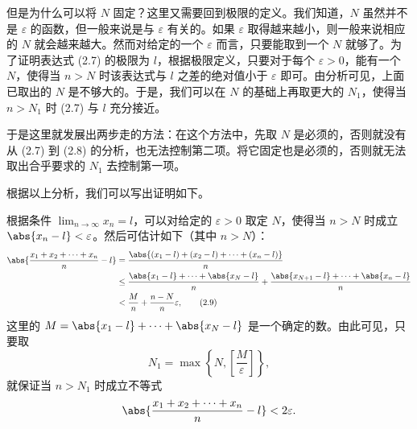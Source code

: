 但是为什么可以将 $N$ 固定？这里又需要回到极限的定义。我们知道，$N$ 虽然并不是 $\varepsilon$ 的函数，但一般来说是与 $\varepsilon$ 有关的。如果 $\varepsilon$ 取得越来越小，则一般来说相应的 $N$ 就会越来越大。然而对给定的一个 $\varepsilon$ 而言，只要能取到一个 $N$ 就够了。为了证明表达式 (2.7) 的极限为 $l$，根据极限定义，只要对于每个 $\varepsilon>0$，能有一个 $N$，使得当 $n>N$ 时该表达式与 $l$ 之差的绝对值小于 $\varepsilon$ 即可。由分析可见，上面已取出的 $N$ 是不够大的。于是，我们可以在 $N$ 的基础上再取更大的 $N_1$，使得当 $n>N_1$ 时 (2.7) 与 $l$ 充分接近。

于是这里就发展出两步走的方法：在这个方法中，先取 $N$ 是必须的，否则就没有从 (2.7) 到 (2.8) 的分析，也无法控制第二项。将它固定也是必须的，否则就无法取出合乎要求的 $N_1$ 去控制第一项。

根据以上分析，我们可以写出证明如下。

\begin{xproof}
根据条件 $\displaystyle\lim_{n\to\infty}x_n=l$，可以对给定的 $\varepsilon>0$ 取定 $N$，使得当 $n>N$ 时成立 $\abs{x_n-l}<\varepsilon$。然后可估计如下（其中 $n>N$）：
\begin{align}
  \abs{\frac{x_1+x_2+\cdots+x_n}{n}-l}
  &=\frac{\abs{(x_1-l)+(x_2-l)+\cdots+(x_n-l)}}{n}\\
  &\le\frac{\abs{x_1-l}+\cdots+\abs{x_N-l}}{n}
    +\frac{\abs{x_{N+1}-l}+\cdots+\abs{x_n-l}}{n}\\
  &<\frac Mn+\frac{n-N}{n}\varepsilon,
  \tag{2.9}
  \label{eq:2.9}
\end{align}
这里的 $M=\abs{x_1-l}+\cdots+\abs{x_N-l}$ 是一个确定的数。由此可见，只要取
\[
  N_1=\max\left\{N,\left[\frac M\varepsilon\right]\right\},
\]
就保证当 $n>N_1$ 时成立不等式
\[
  \abs{\frac{x_1+x_2+\cdots+x_n}{n}-l}<2\varepsilon.
\]
\end{xproof}

